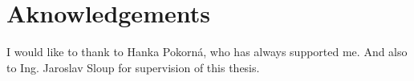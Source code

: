 \vfill

\vglue 14cm

\section*{Aknowledgements}
\indent\indent I would like to thank to Hanka Pokorná, who has always supported me. And also to Ing. Jaroslav Sloup for supervision of this thesis.
